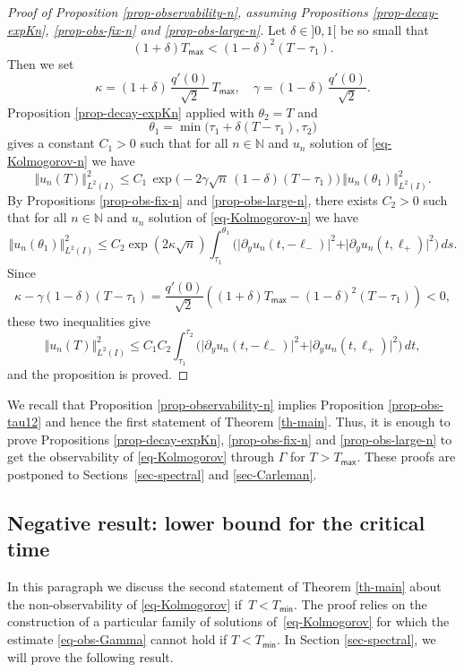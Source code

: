 \documentclass[10pt]{amsart}
\theoremstyle{plain}
\theoremstyle{definition}
\newcommand{\1}{\mathds 1}
\newcommand{\N}{\mathbb{N}}
\let\G\Gamma
\let\th\theta
\newcommand{\Tmin}{T_{\mathsf{min}}}
\newcommand{\Tmax}{T_{\mathsf{max}}}
\begin{document}
\begin{proof}[Proof of Proposition \ref{prop-observability-n}, assuming Propositions \ref{prop-decay-expKn}, \ref{prop-obs-fix-n} and \ref{prop-obs-large-n}]
Let $\delta \in{}]0,1[$ be so small that
\[
(1 +\delta) \Tmax < (1-\delta)^2 (T - \tau_1).
\]
Then we set
\[
\kappa = (1+\delta)\, \frac{q'(0)}{\sqrt{2}}\, \Tmax,
\quad \gamma = (1-\delta)\, \frac{q'(0)}{\sqrt{2}}.
\]
Proposition \ref{prop-decay-expKn} applied with $\th_2 = T$ and
\[
\th_1 = \min\bigl(\tau_1 + \delta (T-\tau_1) , \tau_2 \bigr)
\]
gives a constant $C_1 > 0$ such that for all $n\in \N$ and $u_n$ solution of \eqref{eq-Kolmogorov-n} we have
\[
\Vert u_n (T) \Vert_{L^2(I)}^2 \leq C_1 \, \exp \bigl(-2\gamma \sqrt n\,(1-\delta) (T-\tau_1) \bigr)\, \Vert u_n(\th_1) \Vert_{L^2(I)}^2.
\]
By Propositions \ref{prop-obs-fix-n} and \ref{prop-obs-large-n}, there exists $C_2 > 0$ such that for all $n\in \N$ and $u_n$ solution of \eqref{eq-Kolmogorov-n} we have
\[
\Vert u_n(\th_1) \Vert_{L^2(I)}^2 \leq C_2 \exp(2\kappa \sqrt{n}) {\int_{\tau_1}^{\theta_1}
\bigl(\vert \partial_y u_n(t,-\ell_-)\vert^2 + \vert \partial_y u_n(t,\ell_+) \vert^2 \bigr)\, ds }.
\]
Since
\[
\kappa - \gamma (1-\delta)(T-\tau_1) = \frac{q'(0)}{\sqrt{2}} \left((1+\delta) \Tmax - (1-\delta)^2 (T-\tau_1) \right)< 0,
\]
these two inequalities give
\[
\Vert u_n(T) \Vert_{L^2(I)}^2 \leq C_1C_2 {\int_{\tau_1}^{\tau_2} \bigl(\vert \partial_y u_n(t,-\ell_-)\vert^2 + \vert \partial_y u_n(t,\ell_+) \vert^2 \bigr) \, dt },
\]
and the proposition is proved.
\end{proof}

We recall that Proposition \ref{prop-observability-n} implies Proposition \ref{prop-obs-tau12} and hence the first statement of Theorem \ref{th-main}. Thus, it is enough to prove Propositions \ref{prop-decay-expKn}, \ref{prop-obs-fix-n} and \ref{prop-obs-large-n} to get the observability of \eqref{eq-Kolmogorov} through $\G$ for $T > \Tmax$. These proofs are postponed to Sections~\ref{sec-spectral} and \ref{sec-Carleman}.

\subsection{Negative result: lower bound for the critical time}

In this paragraph we discuss the second statement of Theorem \ref{th-main} about the non-observability of \eqref{eq-Kolmogorov} if~$T < \Tmin$. The proof relies on the construction of a particular family of solutions of~\eqref{eq-Kolmogorov} for which the estimate \eqref{eq-obs-Gamma} cannot hold if $T < \Tmin$. In Section \ref{sec-spectral}, we will prove the following result.
\end{document}
